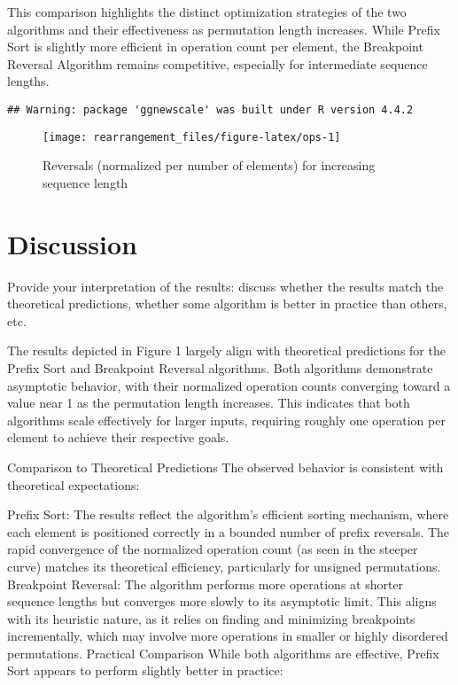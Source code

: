 \documentclass[
  11pt,
  a4paper,
]{article}
\begin{document}
This comparison highlights the distinct optimization strategies of the two algorithms and their effectiveness as permutation length increases. While Prefix Sort is slightly more efficient in operation count per element, the Breakpoint Reversal Algorithm remains competitive, especially for intermediate sequence lengths.

\begin{verbatim}
## Warning: package 'ggnewscale' was built under R version 4.4.2
\end{verbatim}

\begin{figure}

{\centering \texttt{[image: rearrangement\_files/figure-latex/ops-1]} 

}

\caption{Reversals (normalized per number of elements) for increasing sequence length}\label{fig:ops}
\end{figure}

\section{Discussion}\label{discussion}

Provide your interpretation of the results: discuss whether the results match the theoretical predictions, whether some algorithm is better in practice than others, etc.

The results depicted in Figure 1 largely align with theoretical predictions for the Prefix Sort and Breakpoint Reversal algorithms. Both algorithms demonstrate asymptotic behavior, with their normalized operation counts converging toward a value near 1 as the permutation length increases. This indicates that both algorithms scale effectively for larger inputs, requiring roughly one operation per element to achieve their respective goals.

Comparison to Theoretical Predictions
The observed behavior is consistent with theoretical expectations:

Prefix Sort: The results reflect the algorithm's efficient sorting mechanism, where each element is positioned correctly in a bounded number of prefix reversals. The rapid convergence of the normalized operation count (as seen in the steeper curve) matches its theoretical efficiency, particularly for unsigned permutations.
Breakpoint Reversal: The algorithm performs more operations at shorter sequence lengths but converges more slowly to its asymptotic limit. This aligns with its heuristic nature, as it relies on finding and minimizing breakpoints incrementally, which may involve more operations in smaller or highly disordered permutations.
Practical Comparison
While both algorithms are effective, Prefix Sort appears to perform slightly better in practice:
\end{document}

